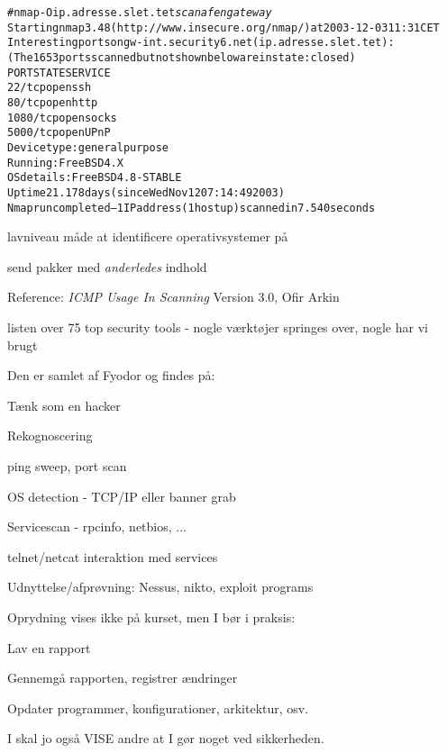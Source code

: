 \documentclass[Screen16to9,17pt]{foils}
\begin{document}
\begin{alltt}
\footnotesize
# nmap -O ip.adresse.slet.tet \emph{scan af en gateway}
Starting nmap 3.48 ( http://www.insecure.org/nmap/ ) at 2003-12-03 11:31 CET
Interesting ports on gw-int.security6.net (ip.adresse.slet.tet):
(The 1653 ports scanned but not shown below are in state: closed)
PORT     STATE SERVICE
22/tcp   open  ssh
80/tcp   open  http
1080/tcp open  socks
5000/tcp open  UPnP
Device type: general purpose
Running: FreeBSD 4.X
OS details: FreeBSD 4.8-STABLE
Uptime 21.178 days (since Wed Nov 12 07:14:49 2003)
Nmap run completed -- 1 IP address (1 host up) scanned in 7.540 seconds
\end{alltt}

\begin{list2}
  \item lavniveau måde at identificere operativsystemer på
\item send pakker med \emph{anderledes} indhold
\item Reference: \emph{ICMP Usage In Scanning} Version 3.0,
  Ofir Arkin\\ 
\end{list2}


\begin{list1}
\item listen over 75 top security
  tools - nogle værktøjer springes over, nogle har vi brugt
\item Den er samlet af Fyodor og findes på:\\
\end{list1}



\begin{list1}
\item Tænk som en hacker
\item Rekognoscering
\begin{list2}
\item ping sweep, port scan
\item OS detection - TCP/IP eller banner grab
\item Servicescan - rpcinfo, netbios, ...
\item telnet/netcat interaktion med services
\end{list2}
\item Udnyttelse/afprøvning: Nessus, nikto, exploit programs
\item Oprydning vises ikke på kurset, men I bør i praksis:
\begin{list2}
\item Lav en rapport
\item Gennemgå rapporten, registrer ændringer
\item Opdater programmer, konfigurationer, arkitektur, osv.
\end{list2}
\item I skal jo også VISE andre at I gør noget ved sikkerheden.
\end{list1}
\end{document}
